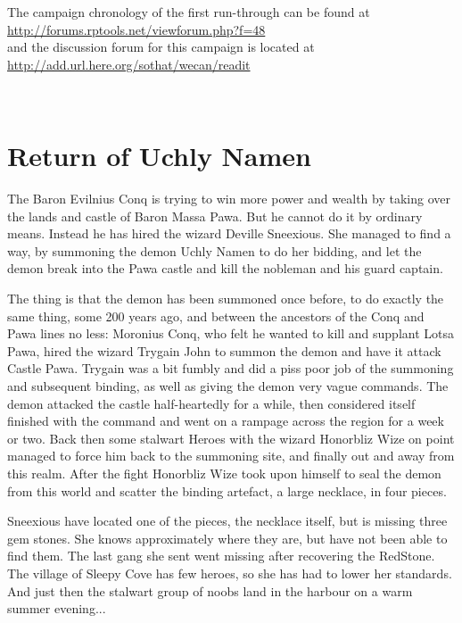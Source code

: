 \documentclass[11pt, twoside, titlepage, a4paper]{report}
\begin{document}
The campaign chronology of the first run-through can be found at \\
\url{http://forums.rptools.net/viewforum.php?f=48} \\
and the discussion forum for this campaign is located at \\ \url{http://add.url.here.org/sothat/wecan/readit}

\


%
%
%
%






\clearpage
\section*{Return of Uchly Namen}

The Baron Evilnius Conq is trying to win more power and wealth by taking over the lands and castle of Baron Massa Pawa. But he cannot do it by ordinary means. Instead he has hired the wizard Deville Sneexious.
She managed to find a way, by summoning the demon Uchly Namen to do her bidding, and let the demon break into the Pawa castle and kill the nobleman and his guard captain.

The thing is that the demon has been summoned once before, to do exactly the same thing, some 200 years ago, and between the ancestors of the Conq and Pawa lines no less: Moronius Conq, who felt he wanted to kill and supplant Lotsa Pawa, hired the wizard Trygain John to summon the demon and have it attack Castle Pawa. Trygain was a bit fumbly and did a piss poor job of the summoning and subsequent binding, as well as giving the demon very vague commands. The demon attacked the castle half-heartedly for a while, then considered itself finished with the command and went on a rampage across the region for a week or two. Back then some stalwart Heroes with the wizard Honorbliz Wize on point managed to force him back to the summoning site, and finally out and away from this realm. After the fight Honorbliz Wize took upon himself to seal the demon from this world and scatter the binding artefact, a large necklace, in four pieces.

Sneexious have located one of the pieces, the necklace itself, but is missing three gem stones. She knows approximately where they are, but have not been able to find them. The last gang she sent went missing after recovering the RedStone. The village of Sleepy Cove has few heroes, so she has had to lower her standards. And just then the stalwart group of noobs land in the harbour on a warm summer evening...
\end{document}
